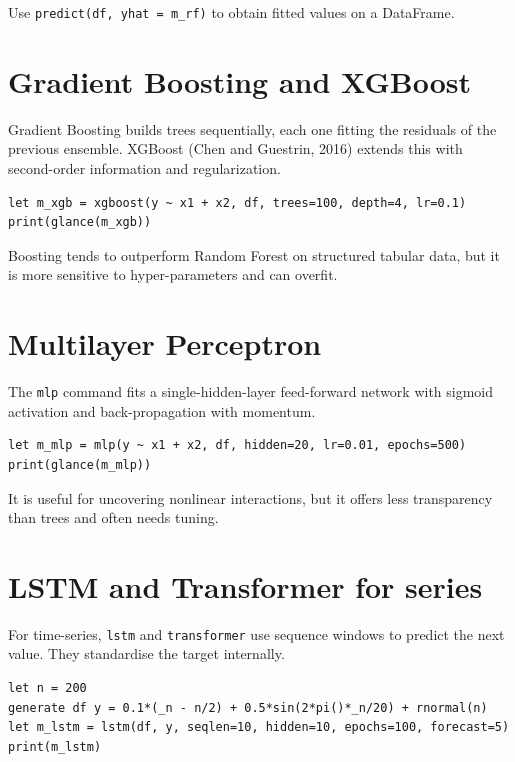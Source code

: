 Use \texttt{predict(df, yhat = m\_rf)} to obtain fitted values on a DataFrame.

\section{Gradient Boosting and XGBoost}

Gradient Boosting builds trees sequentially, each one fitting the
residuals of the previous ensemble. XGBoost (Chen and Guestrin, 2016)
extends this with second-order information and regularization.

\begin{lstlisting}[caption={XGBoost regression}]
let m_xgb = xgboost(y ~ x1 + x2, df, trees=100, depth=4, lr=0.1)
print(glance(m_xgb))
\end{lstlisting}

Boosting tends to outperform Random Forest on structured tabular data,
but it is more sensitive to hyper-parameters and can overfit.

\section{Multilayer Perceptron}

The \texttt{mlp} command fits a single-hidden-layer feed-forward network with
sigmoid activation and back-propagation with momentum.

\begin{lstlisting}[caption={Neural network}]
let m_mlp = mlp(y ~ x1 + x2, df, hidden=20, lr=0.01, epochs=500)
print(glance(m_mlp))
\end{lstlisting}

It is useful for uncovering nonlinear interactions, but it offers less
transparency than trees and often needs tuning.

\section{LSTM and Transformer for series}

For time-series, \texttt{lstm} and \texttt{transformer} use sequence windows to
predict the next value. They standardise the target internally.

\begin{lstlisting}[caption={LSTM forecast}]
let n = 200
generate df y = 0.1*(_n - n/2) + 0.5*sin(2*pi()*_n/20) + rnormal(n)
let m_lstm = lstm(df, y, seqlen=10, hidden=10, epochs=100, forecast=5)
print(m_lstm)
\end{lstlisting}

